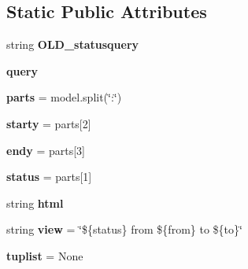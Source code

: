 \subsection*{Static Public Attributes}
\begin{DoxyCompactItemize}
\item 
string {\bfseries O\+L\+D\+\_\+statusquery}
\item 
\mbox{\label{classdatatypes_1_1Governance__Change_1_1Governance__Change_af866f1fa7afce0c014995dcaa2d3102d}} 
{\bfseries query}
\item 
\mbox{\label{classdatatypes_1_1Governance__Change_1_1Governance__Change_ac7a7d4199d9622eae74956adf9905253}} 
{\bfseries parts} = model.\+split(\char`\"{}\+:\char`\"{})
\item 
\mbox{\label{classdatatypes_1_1Governance__Change_1_1Governance__Change_af38519ac736d6696e470582c153a8f63}} 
{\bfseries starty} = parts\mbox{[}2\mbox{]}
\item 
\mbox{\label{classdatatypes_1_1Governance__Change_1_1Governance__Change_a0bcc30bf2d0b6447005fed4dd0836410}} 
{\bfseries endy} = parts\mbox{[}3\mbox{]}
\item 
\mbox{\label{classdatatypes_1_1Governance__Change_1_1Governance__Change_a9d4631b5e5a2a8fd013d6c30b7b65333}} 
{\bfseries status} = parts\mbox{[}1\mbox{]}
\item 
string {\bfseries html}
\item 
\mbox{\label{classdatatypes_1_1Governance__Change_1_1Governance__Change_a4b868d6a563cd25ddd4ac4095758f526}} 
string {\bfseries view} = \char`\"{}\$\{status\} from \$\{from\} to \$\{to\}\char`\"{}
\item 
\mbox{\label{classdatatypes_1_1Governance__Change_1_1Governance__Change_afcebbd706152ffed09f812e249eff339}} 
{\bfseries tuplist} = None
\item 

\end{DoxyCompactItemize}

